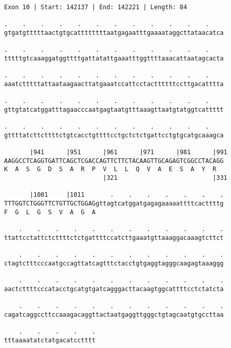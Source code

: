 \documentclass{article}
\begin{document}
\begin{Verbatim}
Exon 10 | Start: 142137 | End: 142221 | Length: 84
 
.    .    .    .    .    .    .    .    .    .    .    .    
gtgatgtttttaactgtgcattttttttaatgagaatttgaaaataggcttataacatca
  
.    .    .    .    .    .    .    .    .    .    .    .    
tttttgtcaaaggatggttttgattatattgaaatttggttttaaacattaatagcacta
  
.    .    .    .    .    .    .    .    .    .    .    .    
aaatctttttattaataagaacttatgaaatccattcctacttttttccttgacatttta
  
.    .    .    .    .    .    .    .    .    .    .    .    
gttgtatcatggatttagaacccaatgagtaatgtttaaagttaatgtatggtcattttt
  
.    .    .    .    .    .    .    .    .    .    .    .    
gttttatcttcttttctgtcacctgttttcctgctctctgattcctgtgcatgcaaagca
  
       |941      |951      |961      |971      |981      |991
AAGGCCTCAGGTGATTCAGCTCGACCAGTTCTTCTACAAGTTGCAGAGTCGGCCTACAGG
K  A  S  G  D  S  A  R  P  V  L  L  Q  V  A  E  S  A  Y  R  
                           |321                          |331
  
       |1001     |1011       .    .    .    .    .    .    .
TTTGGTCTGGGTTCTGTTGCTGGAGgttagtcatggatgagagaaaaattttcacttttg
F  G  L  G  S  V  A  G  A                                   
  
    .    .    .    .    .    .    .    .    .    .    .    .
ttattcctattctcttttctctgattttccatcttgaaatgttaaaggacaaagtcttct
  
    .    .    .    .    .    .    .    .    .    .    .    .
ctagtctttcccaatgccagttatcagtttctacctgtgaggtagggcaagagtaaaggg
  
    .    .    .    .    .    .    .    .    .    .    .    .
aactcttttcccatacctgcatgtgatcagggacttacaagtggcattttcctctatcta
  
    .    .    .    .    .    .    .    .    .    .    .    .
cagatcaggccttccaaagacaggttactaatgaggttgggctgtagcaatgtgccttaa
  
    .    .    .    .    .
tttaaaatatctatgacatcctttt
\end{Verbatim}
\newpage
\end{document}
